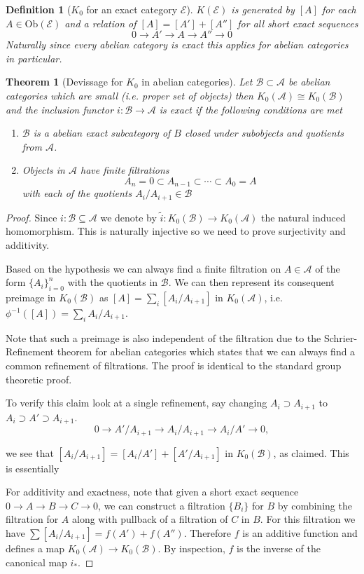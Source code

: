 \documentclass[12pt]{article}
\numberwithin{equation}{section}
\newcounter{dummy} \numberwithin{dummy}{section}
\newtheorem{theorem}[dummy]{Theorem}
\newtheorem{definition}[dummy]{Definition}
\begin{document}
	\begin{definition}[$K_0$ for an exact category $\mathcal{E}$]
		$K(\mathcal E)$ is generated by $[A]$ for each $A \in \mathrm{Ob}(\mathcal{E})$ and a relation of $[A]=[A']+[A'']$ for all short exact sequences \[ 0 \to A' \to A \to A'' \to 0 \]
		Naturally since every abelian category is exact this applies for abelian categories in particular.
	\end{definition}
	\begin{theorem}[Devissage for $K_0$ in abelian categories]
		Let $\mathcal B \subset \mathcal A$ be abelian categories which are small (i.e. proper set of objects) then $K_0(\mathcal A) \cong K_0(\mathcal B)$ and the inclusion functor $i:\mathcal{B} \to \mathcal{A}$ is exact if the following conditions are met
		\begin{enumerate}
			\item $\mathcal B$ is a abelian exact subcategory of $B$ closed under subobjects and quotients from $\mathcal{A}$.
			\item Objects in $\mathcal{A}$ have finite filtrations \[ A_n=0 \subset A_{n-1} \subset \cdots \subset A_0 =A \] with each of the quotients $A_i/A_{i+1} \in \mathcal{B}$
		\end{enumerate}
	\end{theorem}
	\begin{proof}
		Since $i:\mathcal{B} \subseteq \mathcal{A} $ we denote by $ \tilde{i} : K_0(\mathcal{B}) \to K_0(\mathcal{A})$ the natural induced homomorphism. This is naturally injective so we need to prove surjectivity and additivity.
		
		Based on the hypothesis we can always find a finite filtration on $A \in \mathcal{A}$ of the form $\{A_i\}_{i=0}^n$ with the quotients in $\mathcal{B}$. We can then represent its consequent preimage in $K_0(\mathcal{B})$ as $[A] = \sum_i [A_i / A_{i+1}]$ in $ K_0(\mathcal{A} )$, i.e. $\phi^{-1}([A])=\sum_i A_i/A_{i+1}$.
			
		Note that such a preimage is also independent of the filtration due to the Schrier-Refinement theorem for abelian categories which states that we can always find a common refinement of filtrations. The proof is identical to the standard group theoretic proof.
			
		To verify this claim look at a single refinement, say changing $A_i \supset A_{i+1}$ to $A_i \supset A' \supset A_{i+1}$. 
		\[
		0 \to A' / A_{i+1} \to A_i / A_{i+1} \to A_i / A' \to 0,
		\]
		
		we see that $[A_i / A_{i+1}] = [A_i / A'] + [A' / A_{i+1}]$ in $K_0(\mathcal{B})$, as claimed. This is essentially 
		
		For additivity and exactness, note that given a short exact sequence $0 \to A \to B \to C \to 0$, we can construct a filtration $\{B_i\}$ for $B$ by combining the filtration for $A$ along with pullback of a filtration of $C$ in $B$. For this filtration we have $\sum [A_i / A_{i+1}] = f(A') + f(A'')$. Therefore $f$ is an additive function and defines a map $K_0(\mathcal{A}) \to K_0(\mathcal{B})$. By inspection, $f$ is the inverse of the canonical map $i_*$.
	\end{proof}
\end{document}
